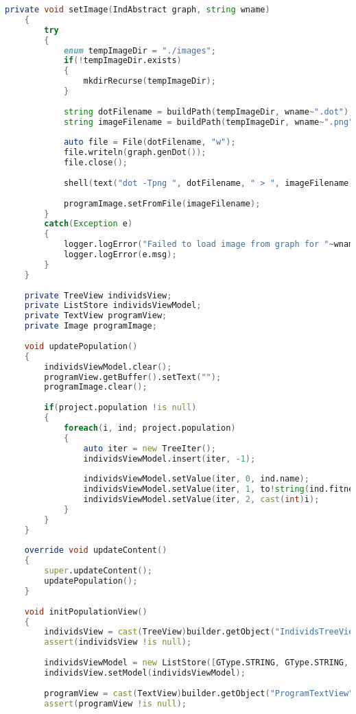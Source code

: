 \documentclass[russian,utf8,emptystyle]{eskdtext}
\begin{document}
\begin{lstlisting}[language=D]
    private void setImage(IndAbstract graph, string wname)
    {
        try
        {
            enum tempImageDir = "./images";
            if(!tempImageDir.exists)
            {
                mkdirRecurse(tempImageDir);
            }
            
            string dotFilename = buildPath(tempImageDir, wname~".dot");
            string imageFilename = buildPath(tempImageDir, wname~".png");
            
            auto file = File(dotFilename, "w"); 
            file.writeln(graph.genDot());
            file.close();
            
            shell(text("dot -Tpng ", dotFilename, " > ", imageFilename));
            
            programImage.setFromFile(imageFilename);
        }
        catch(Exception e)
        {
            logger.logError("Failed to load image from graph for "~wname);
            logger.logError(e.msg);
        }
    }
    
    private TreeView individsView;
    private ListStore individsViewModel;
    private TextView programView;
    private Image programImage;
    
    void updatePopulation()
    {
    	individsViewModel.clear();
    	programView.getBuffer().setText("");
    	programImage.clear();
    	
    	if(project.population !is null)
    	{
        	foreach(i, ind; project.population)
        	{
        		auto iter = new TreeIter();
        		individsViewModel.insert(iter, -1);
        		
        		individsViewModel.setValue(iter, 0, ind.name);
        		individsViewModel.setValue(iter, 1, to!string(ind.fitness));
        		individsViewModel.setValue(iter, 2, cast(int)i);
        	}
    	}
    }
    
    override void updateContent()
    {
        super.updateContent();
        updatePopulation();
    }
    
    void initPopulationView()
    {
    	individsView = cast(TreeView)builder.getObject("IndividsTreeView");
    	assert(individsView !is null);
    	
    	individsViewModel = new ListStore([GType.STRING, GType.STRING, GType.INT]);
        individsView.setModel(individsViewModel);
        
        programView = cast(TextView)builder.getObject("ProgramTextView");
        assert(programView !is null);
        

\end{lstlisting}
\end{document}
